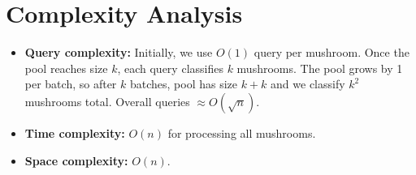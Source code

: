 \documentclass[11pt,a4paper]{article}
\begin{document}
\section{Complexity Analysis}
\begin{itemize}
  \item \textbf{Query complexity:} Initially, we use $O(1)$ query per mushroom. Once the pool reaches size $k$, each query classifies $k$ mushrooms. The pool grows by 1 per batch, so after $k$ batches, pool has size $k + k$ and we classify $k^2$ mushrooms total. Overall queries $\approx O(\sqrt{n})$.
  \item \textbf{Time complexity:} $O(n)$ for processing all mushrooms.
  \item \textbf{Space complexity:} $O(n)$.
\end{itemize}
\end{document}
